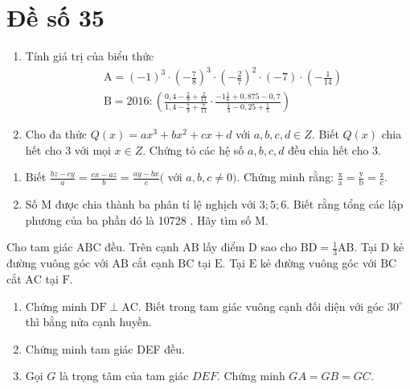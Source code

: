 \onehalfspacing
\section{Đề số 35}

\begin{bt} 
	\hfill
	\begin{enumerate}[1.]
		\item Tính giá trị của biểu thức
		$$
		\begin{aligned}
			& \mathrm{A}=(-1)^3 \cdot\left(-\frac{7}{8}\right)^3 \cdot\left(-\frac{2}{7}\right)^2 \cdot(-7) \cdot\left(-\frac{1}{14}\right) \\
			& \mathrm{B}=2016:\left(\frac{0,4-\frac{2}{9}+\frac{2}{11}}{1,4-\frac{7}{9}+\frac{7}{11}} \cdot \frac{-1 \frac{1}{6}+0,875-0,7}{\frac{1}{3}-0,25+\frac{1}{5}}\right)
		\end{aligned}
		$$
		\item Cho đa thức $Q(x)=a x^3+b x^2+c x+d$ với $a, b, c, d \in Z$. Biết $Q(x)$ chia hết cho 3 với mọi $x \in Z$. Chứng tỏ các hệ số $a, b, c, d$ đều chia hết cho 3.
	\end{enumerate}
	\loigiai{} 
\end{bt}

\begin{bt}
	\hfill
	\begin{enumerate}[1.]
		\item Biết $\frac{b z-c y}{a}=\frac{c x-a z}{b}=\frac{a y-b x}{c}($ với $a, b, c \neq 0)$.
		Chứng minh rằng: $\frac{\mathrm{x}}{\mathrm{a}}=\frac{\mathrm{y}}{\mathrm{b}}=\frac{\mathrm{z}}{\mathrm{c}}$.
		\item Số $\mathrm{M}$ được chia thành ba phân tỉ lệ nghịch với $3 ; 5 ; 6$. Biết rằng tổng các lập phương của ba phần đó là 10728 . Hãy tìm số $\mathrm{M}$.
	\end{enumerate}
	\loigiai{} 
\end{bt}

\begin{bt}
	Cho tam giác $\mathrm{ABC}$ đều. Trên cạnh $\mathrm{AB}$ lấy điểm $\mathrm{D}$ sao cho $\mathrm{BD}=\frac{1}{3} \mathrm{AB}$. Tại $\mathrm{D}$ kẻ đường vuông góc với $\mathrm{AB}$ cắt cạnh $\mathrm{BC}$ tại $\mathrm{E}$. Tại $\mathrm{E}$ kẻ đường vuông góc với $\mathrm{BC}$ cắt $\mathrm{AC}$ tại $\mathrm{F}$.
	\begin{enumerate}[1.]
		\item Chứng minh $\mathrm{DF} \perp \mathrm{AC}$. Biết trong tam giác vuông cạnh đối diện với góc $30^{\circ}$ thì bằng nửa cạnh huyền.
		\item Chứng minh tam giác DEF đều.
		\item Gọi $G$ là trọng tâm của tam giác $D E F$. Chứng minh $G A=G B=G C$.
	\end{enumerate}
	\loigiai{}
\end{bt}

